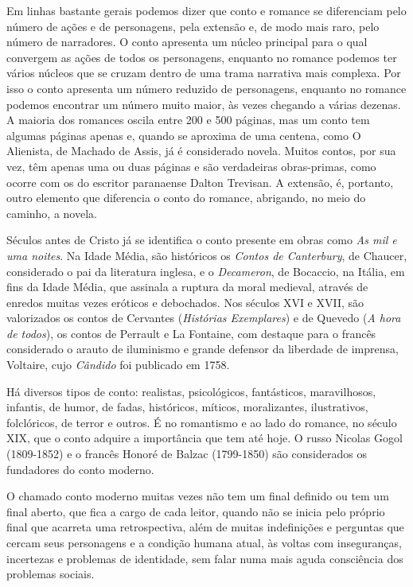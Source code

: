 Em linhas bastante gerais podemos dizer que conto e romance se diferenciam pelo número de ações e de personagens, pela extensão e, de modo mais raro, pelo número de narradores. O conto apresenta um núcleo principal para o qual convergem as ações de todos os personagens, enquanto no romance podemos ter vários núcleos que se cruzam dentro de uma trama narrativa mais complexa. Por isso o conto apresenta um número reduzido de personagens, enquanto no romance podemos encontrar um número muito maior, às vezes chegando a várias dezenas. A maioria dos romances oscila entre 200 e 500 páginas, mas um conto tem algumas páginas apenas e, quando se aproxima de uma centena, como O Alienista, de Machado de Assis, já é considerado novela. Muitos contos, por sua vez, têm apenas uma ou duas páginas e são verdadeiras obras-primas, como ocorre com os do escritor paranaense Dalton Trevisan. A extensão, é, portanto, outro elemento que diferencia o conto do romance, abrigando, no meio do caminho, a novela.

Séculos antes de Cristo já se identifica o conto presente em obras como \textit{As mil e uma noites}. Na Idade Média, são históricos os \textit{Contos de Canterbury}, de Chaucer, considerado o pai da literatura inglesa, e o \textit{Decameron}, de Bocaccio, na Itália, em fins da Idade Média, que assinala a ruptura da moral medieval, através de enredos muitas vezes eróticos e debochados. Nos séculos XVI e XVII, são valorizados os contos de Cervantes (\textit{Histórias Exemplares}) e de Quevedo (\textit{A hora de todos}), os contos de Perrault e La Fontaine, com destaque para o francês considerado o arauto de iluminismo e grande defensor da liberdade de imprensa, Voltaire, cujo \textit{Cândido} foi publicado em 1758. 

Há diversos tipos de conto: realistas, psicológicos, fantásticos, maravilhosos, infantis, de humor, de fadas, históricos, míticos, moralizantes, ilustrativos, folclóricos, de terror e outros. É no romantismo e ao lado do romance, no século XIX, que o conto adquire a importância que tem até hoje. O russo Nicolas Gogol (1809-1852) e o francês Honoré de Balzac (1799-1850) são considerados os fundadores do conto moderno.

O chamado conto moderno muitas vezes não tem um final definido ou tem um final aberto, que fica a cargo de cada leitor, quando não se inicia pelo próprio final que acarreta uma retrospectiva, além de muitas indefinições e perguntas que cercam seus personagens e a condição humana atual, às voltas com inseguranças, incertezas e problemas de identidade, sem falar numa mais aguda consciência dos problemas sociais.

